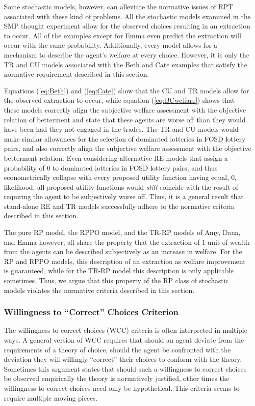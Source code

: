 \documentclass[11pt,a4paper]{article}
\begin{document}
Some stochastic models, however, can alleviate the normative issues of RPT associated with these kind of problems.
All the stochastic models examined in the SMP thought experiment allow for the observed choices resulting in an extraction to occur.
All of the examples except for Emma even predict the extraction will occur with the same probability.
Additionally, every model allows for a mechanism to describe the agent's welfare at every choice.
However, it is only the TR and CU models associated with the Beth and Cate examples that satisfy the normative requirement described in this section.

Equations (\ref{eq:Beth}) and (\ref{eq:Cate}) show that the CU and TR models allow for the observed extraction to occur, while equation (\ref{eq:BCwelfare}) shows that these models correctly align the subjective welfare assessment with the objective relation of betterment and state that these agents are worse off than they would have been had they not engaged in the trades.
The TR and CU models would make similar allowances for the selection of dominated lotteries in FOSD lottery pairs, and also correctly align the subjective welfare assessment with the objective betterment relation.
Even considering alternative RE models that assign a probability of $0$ to dominated lotteries in FOSD lottery pairs, and thus econometrically collapse with every proposed utility function having equal, $0$, likelihood, all proposed utility functions would \textit{still} coincide with the result of requiring the agent to be subjectively worse off.
Thus, it is a general result that stand-alone RE and TR models successfully adhere to the normative criteria described in this section.

The pure RP model, the RPPO model, and the TR-RP models of Amy, Dana, and Emma however, all share the property that the extraction of 1 unit of wealth from the agents can be described subjectively as an increase in welfare.
For the RP and RPPO models, this description of an extraction as welfare improvement is guaranteed, while for the TR-RP model this description is only applicable sometimes.
Thus, we argue that this property of the RP class of stochastic models violates the normative criteria described in this section.


\subsubsection{Willingness to \enquote{Correct} Choices Criterion}

The willingness to correct choices (WCC) criteria is often interpreted in multiple ways.
A general version of WCC requires that should an agent deviate from the requirements of a theory of choice, should the agent be confronted with the deviation they will willingly \enquote{correct} their choices to conform with the theory.
Sometimes this argument states that should such a willingness to correct choices be observed empirically the theory is normatively justified, other times the willingness to correct choices need only be hypothetical.
This criteria seems to require multiple moving pieces. 
\end{document}
